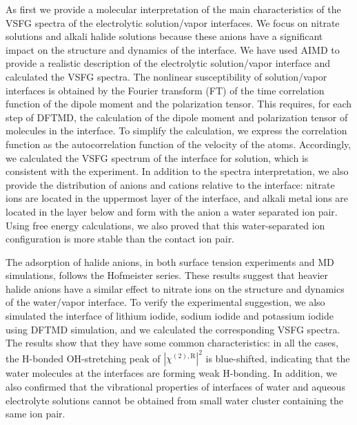 As first we provide a molecular interpretation of the main characteristics of the
VSFG spectra of the electrolytic solution/vapor interfaces.
We focus on nitrate solutions and alkali halide solutions because these anions have a significant impact on the structure and dynamics of the interface.
We have used AIMD to provide a realistic description of the electrolytic solution/vapor interface and calculated the VSFG spectra.
The nonlinear susceptibility of solution/vapor interfaces is obtained by the Fourier transform (FT) of 
the time correlation function of the dipole moment and the polarization tensor. This requires, for each step of DFTMD, 
the calculation of the dipole moment and polarization tensor of molecules in the interface. 
To simplify the calculation, we express the correlation function 
as the autocorrelation function of the velocity of the atoms. 
Accordingly, we calculated the VSFG spectrum of the interface for \LiN solution,
which is consistent with the experiment. 
In addition to the spectra interpretation, we also provide the distribution of anions 
and cations relative to the interface: nitrate ions are located in the uppermost layer of the interface, 
and alkali metal ions are located in the layer below and form with the anion a water separated ion pair. 
Using free energy calculations, we also proved that this water-separated ion configuration is more stable than the contact ion pair.

The adsorption of halide anions, in both surface tension experiments and MD simulations, 
follows the Hofmeister series.
These results suggest that heavier halide anions have a similar effect to nitrate ions on the structure and dynamics of the water/vapor interface. 
To verify the experimental suggestion, we also simulated the interface of lithium iodide, sodium iodide and potassium iodide  using DFTMD simulation,
and we calculated the corresponding VSFG spectra.
The results show that they have some common characteristics: in all the cases, 
the H-bonded OH-stretching peak of $|\chi^{(2),\text{R}}|^2$ is blue-shifted, 
indicating that the water molecules at the interfaces are forming weak H-bonding.
In addition, we also confirmed that the vibrational properties of interfaces of water and aqueous electrolyte solutions cannot be obtained from small water cluster containing the same ion pair.

